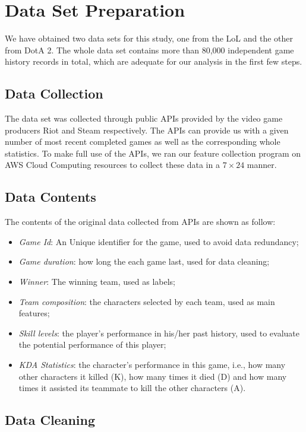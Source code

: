 \documentclass[conference]{IEEEtran}
\begin{document}
\section{Data Set Preparation}
We have obtained two data sets for this study, one from the LoL and the other from DotA 2. The whole data set contains more than 80,000 independent game history records in total, which are adequate for our analysis in the first few steps.

\subsection{Data Collection}

The data set was collected through public APIs provided by the video game producers Riot and Steam respectively. The APIs can provide us with a given number of most recent completed games as well as the corresponding whole statistics. To make full use of the APIs, we ran our feature collection program on AWS Cloud Computing resources to collect these data in a $7\times24$ manner.


\subsection{Data Contents}

The contents of the original data collected from APIs are shown as follow:


\begin{itemize}
\item \textit{Game Id}: An Unique identifier for the game, used to avoid data redundancy;
\item \textit{Game duration}: how long the each game last, used for data cleaning;
\item \textit{Winner}: The winning team, used as labels;
\item \textit{Team composition}: the characters selected by each team, used as main features;
\item \textit{Skill levels}: the player's performance in his/her past history, used to evaluate the potential performance of this player;
\item \textit{KDA Statistics}: the character's performance in this game, i.e., how many other characters it killed (K), how many times it died (D) and how many times it assisted its teammate to kill the other characters (A).
\end{itemize}

\subsection{Data Cleaning}
\end{document}
